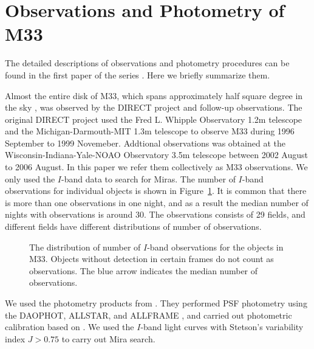 \section{Observations and Photometry of M33} \label{sec.observations}

The detailed descriptions of observations and photometry procedures can be found in the first paper of the series \citep{2011ApJS..193...26P}. Here we briefly summarize them.

Almost the entire disk of M33, which spans approximately half square degree in the sky \citep{1895MNRAS..56...70R}, was observed by the DIRECT project and follow-up observations. The original DIRECT project used the Fred L. Whipple Observatory 1.2m telescope and the Michigan-Darmouth-MIT 1.3m telescope to observe M33 during 1996 September to 1999 Novemeber. Addtional observations was obtained at the Wisconsin-Indiana-Yale-NOAO Observatory 3.5m telescope between 2002 August to 2006 August. In this paper we refer them collectively as M33 observations. We only used the $I$-band data to search for Miras. The number of $I$-band observations for individual objects is shown in Figure~\ref{fig.n_obs}. It is common that there is more than one observations in one night, and as a result the median number of nights with observations is around 30. The observations consists of 29 fields, and different fields have different distributions of number of observations.

\begin{figure}
\caption{The distribution of number of $I$-band observations for the objects in M33. Objects without detection in certain frames do not count as observations. The blue arrow indicates the median number of observations.}\label{fig.n_obs}
\end{figure}

We used the photometry products from \cite{2011ApJS..193...26P}. They performed PSF photometry using the DAOPHOT, ALLSTAR, and ALLFRAME \citep{1987PASP...99..191S,1994PASP..106..250S}, and carried out photometric calibration based on \cite{2006AJ....131.2478M}. We used the $I$-band light curves with Stetson's variability index $J>0.75$ \citep{1996PASP..108..851S} to carry out Mira search.
